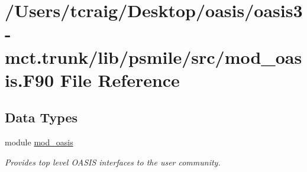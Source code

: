 \hypertarget{mod__oasis_8_f90}{\section{/\+Users/tcraig/\+Desktop/oasis/oasis3-\/mct.trunk/lib/psmile/src/mod\+\_\+oasis.F90 File Reference}
\label{mod__oasis_8_f90}
}
\subsection*{Data Types}
\begin{DoxyCompactItemize}
\item 
module \hyperlink{classmod__oasis}{mod\+\_\+oasis}
\begin{DoxyCompactList}\small\item\em Provides top level O\+A\+S\+I\+S interfaces to the user community. \end{DoxyCompactList}\end{DoxyCompactItemize}
